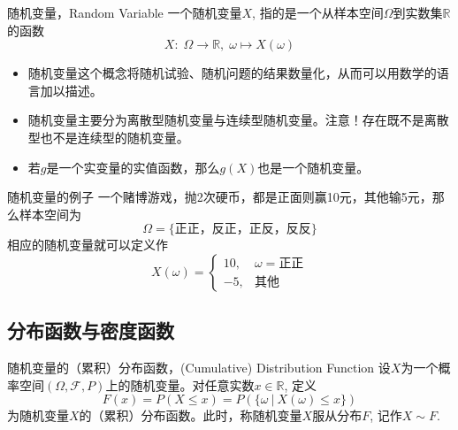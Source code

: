\begin{frame}

\begin{block}{随机变量，Random Variable}
一个随机变量$X$, 指的是一个从{\color{red}样本空间}$\Omega$到实数集$\mathbb{R}$的函数
\[X: \; \Omega \rightarrow \mathbb{R}, \; \omega \mapsto X(\omega)\]
\end{block}

\vspace{1em}
\pause

\begin{remark}
\begin{itemize}
\item 随机变量这个概念将随机试验、随机问题的结果数量化，从而可以用数学的语言加以描述。
\item 随机变量主要分为离散型随机变量与连续型随机变量。{\color{red}注意}！存在既不是离散型也不是连续型的随机变量。
\item 若$g$是一个实变量的实值函数，那么$g(X)$也是一个随机变量。
\end{itemize}
\end{remark}

\end{frame}


\begin{frame}

\begin{block}{随机变量的例子}
一个赌博游戏，抛2次硬币，都是正面则赢10元，其他输5元，那么样本空间为
\[\Omega = \{\text{正正，反正，正反，反反}\}\]
相应的随机变量就可以定义作
\[X(\omega) = \begin{cases}
10, & \omega = \text{正正} \\
-5, & \text{其他}
\end{cases}\]
\end{block}

\end{frame}


\subsection{分布函数与密度函数}


\begin{frame}

\begin{block}{随机变量的（累积）分布函数，(Cumulative) Distribution Function}
设$X$为一个{\color{red}概率空间}$(\Omega, \mathcal{F}, P)$上的随机变量。对任意实数$x\in\mathbb{R}$, 定义
\[F(x) = P(X \le x) = P(\{\omega \ |\ X(\omega) \le x\})\]
为随机变量$X$的（累积）分布函数。此时，称随机变量$X$服从分布$F$, 记作$X \sim F$.
\end{block}

\end{frame}

